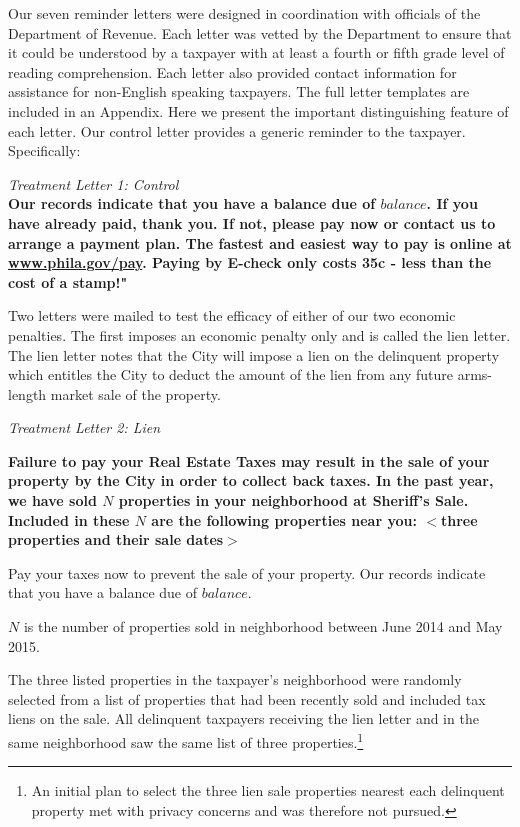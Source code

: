 \documentclass[12pt]{article}
\begin{document}
Our seven reminder letters were designed in coordination with
officials of the Department of Revenue.  Each letter was vetted by the
Department to ensure that it could be understood by a taxpayer with at
least a fourth or fifth grade level of reading comprehension.  Each
letter also provided contact information for assistance for
non-English speaking taxpayers.  The full letter templates are
included in an Appendix.  Here we present the important distinguishing
feature of each letter.  Our control letter provides a generic
reminder to the taxpayer. Specifically:
 
{\it Treatment Letter 1: Control } \\ {\bf Our records indicate that you have a balance due of $balance$.
	If you have already paid, thank you. If not, please pay now or contact us
	to arrange a payment plan. The fastest and easiest way to pay is online at
	\underline{www.phila.gov/pay}. Paying by E-check only costs 35c - 
	less than the cost of a stamp!"}

Two letters were mailed to test the efficacy of either of our
  two economic penalties.  The first imposes an economic penalty
        only and is called the lien letter.  The lien letter notes
        that the City will impose a lien on the delinquent property
        which entitles the City to deduct the amount of the lien from
        any future arms-length market sale of the property.  
        
{\it Treatment Letter 2: Lien } \\  {\bf  Failure to pay your Real Estate Taxes may result in the sale of 
	your property by the City in order to collect back taxes. In the 
	past year, we have sold $N$ properties in your neighborhood at 
	Sheriff's Sale.	Included in these $N$ are the following properties 
	near you: $<$three properties and their sale dates$>$ 

	Pay your taxes now to prevent the sale of your property. 
	Our records indicate that you have a balance due of $balance$.}

$N$ is the number of properties sold in neighborhood between June 2014
and May 2015.

The three listed properties in the taxpayer's neighborhood were
randomly selected from a list of properties that had been recently
sold and included tax liens on the sale.  All delinquent taxpayers
receiving the lien letter and in the same neighborhood saw the same
list of three properties.\footnote{An initial plan to select the three
  lien sale properties nearest each delinquent property met with
  privacy concerns and was therefore not pursued.}
\end{document}

